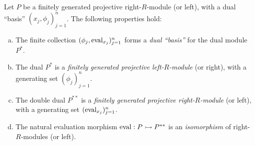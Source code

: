 \begin{proposition}
    \label{prop:properties-of-fg-proj-modules-and-duals}
    Let \(P\) be a finitely generated projective right-\(R\)-module (or left), with
    a dual ``basis'' \((x_j, \phi_j)_{j=1}^n\). The following properties hold:
    \begin{enumerate}[(a)]\setlength\itemsep{0em}
        \item The finite collection \((\phi_j, \operatorname{eval}_{x_j})_{j=1}^n\) forms a \emph{dual
                  ``basis''} for the dual module \(P^{*}\).
        \item The dual \(P^{*}\) is a \emph{finitely generated projective
                  left-\(R\)-module} (or right), with a generating set \((\phi_j)_{j=1}^n\).
        \item The double dual \(P^{* *}\) is a \emph{finitely generated projective
                  right-\(R\)-module} (or left), with a generating set
              \((\operatorname{eval}_{x_j})_{j=1}^n\).
        \item The natural evaluation morphism \(\operatorname{eval}: P \rightarrowtail P^{* *}\) is an
              \emph{isomorphism} of right-\(R\)-modules (or left).
    \end{enumerate}
\end{proposition}

